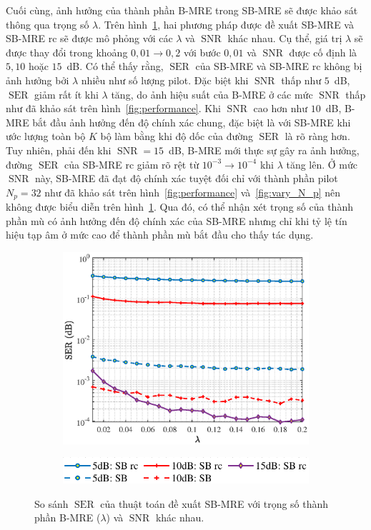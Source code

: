 Cuối cùng, ảnh hưởng của thành phần B-MRE trong SB-MRE sẽ được khảo sát thông qua trọng số $\lambda$. Trên hình~\ref{fig:vary_lambda}, hai phương pháp được đề xuất SB-MRE và SB-MRE rc sẽ được mô phỏng với các $\lambda$ và $\operatorname{SNR}$ khác nhau. Cụ thể, giá trị $\lambda$ sẽ được thay đổi trong khoảng $0,01 \rightarrow 0,2$ với bước $0,01$ và $\operatorname{SNR}$ được cố định là $5, 10$ hoặc $15$~dB. Có thể thấy rằng, $\operatorname{SER}$ của SB-MRE và SB-MRE rc không bị ảnh hưởng bởi $\lambda$ nhiều như số lượng pilot. Đặc biệt khi $\operatorname{SNR}$ thấp như $5$~dB, $\operatorname{SER}$ giảm rất ít khi $\lambda$ tăng, do ảnh hiệu suất của B-MRE ở các mức $\operatorname{SNR}$ thấp như đã khảo sát trên hình~\ref{fig:performance}. Khi $\operatorname{SNR}$ cao hơn như $10$~dB, B-MRE bắt đầu ảnh hưởng đến độ chính xác chung, đặc biệt là với SB-MRE khi ước lượng toàn bộ $K$ bộ làm bằng khi độ dốc của đường $\operatorname{SER}$ là rõ ràng hơn. Tuy nhiên, phải đến khi $\operatorname{SNR}=15$~dB, B-MRE mới thực sự gây ra ảnh hưởng, đường $\operatorname{SER}$ của SB-MRE rc giảm rõ rệt từ $10^{-3} \rightarrow 10^{-4}$ khi $\lambda$ tăng lên. Ở mức $\operatorname{SNR}$ này, SB-MRE đã đạt độ chính xác tuyệt đối chỉ với thành phần pilot $N_p = 32$ như đã khảo sát trên hình~\ref{fig:performance} và~\ref{fig:vary_N_p} nên không được biểu diễn trên hình~\ref{fig:vary_lambda}. Qua đó, có thể nhận xét trọng số của thành phần mù có ảnh hưởng đến độ chính xác của SB-MRE nhưng chỉ khi tỷ lệ tín hiệu tạp âm ở mức cao để thành phần mù bắt đầu cho thấy tác dụng.

\begin{figure}
    \centering
    \begin{subfigure}
         \centering
         \includegraphics[width=.8\linewidth]{figures/vary_lambda.eps}
     \end{subfigure}
     \hfill
     \begin{subfigure}
         \centering
         \includegraphics[width=.6\linewidth]{figures/legend_1.pdf}
     \end{subfigure}
     \hfill
    \caption{So sánh $\operatorname{SER}$ của thuật toán đề xuất SB-MRE với trọng số thành phần B-MRE ($\lambda$) và $\operatorname{SNR}$ khác nhau.}
    \label{fig:vary_lambda}
\end{figure}

